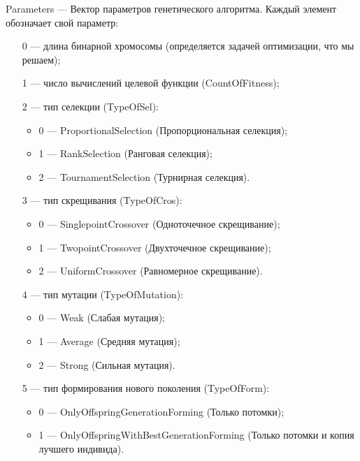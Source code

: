 \documentclass[a4paper,12pt]{article}
\begin{document}
Parameters --- Вектор параметров генетического алгоритма. Каждый элемент обозначает свой параметр:
 
 \begin{itemize}
 \item [0] --- длина бинарной хромосомы (определяется задачей оптимизации, что мы решаем);
 
 \item [1] --- число вычислений целевой функции (CountOfFitness);
 
 \item [2] --- тип селекции (TypeOfSel):
 
 \begin{itemize}
       \item 0 --- ProportionalSelection (Пропорциональная селекция);
 
       \item 1 --- RankSelection (Ранговая селекция);
 
       \item 2 --- TournamentSelection (Турнирная селекция).
	    \end{itemize}
 
 \item [3] --- тип скрещивания (TypeOfCros):
  \begin{itemize}
       \item 0 --- SinglepointCrossover (Одноточечное скрещивание);
 
       \item 1 --- TwopointCrossover (Двухточечное скрещивание);
 
       \item 2 --- UniformCrossover (Равномерное скрещивание).
	    \end{itemize}
 
 \item [4] --- тип мутации (TypeOfMutation):
  \begin{itemize}
       \item 0 --- Weak (Слабая мутация);
 
       \item 1 --- Average (Средняя мутация);
 
       \item 2 --- Strong (Сильная мутация).
	    \end{itemize}
 
 \item [5] --- тип формирования нового поколения (TypeOfForm):
  \begin{itemize}
       \item 0 --- OnlyOffspringGenerationForming (Только потомки);
 
       \item 1 --- OnlyOffspringWithBestGenerationForming (Только потомки и копия лучшего индивида).
	    \end{itemize}
 \end{itemize}
 
\end{document}
